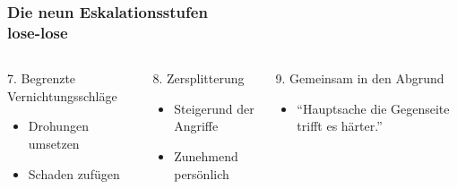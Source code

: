\documentclass[
	ngerman,
	xcolor=dvipsnames,
	11pt
	]{beamer}
\begin{document}
\begin{frame}
	\frametitle{Die neun Eskalationsstufen\\lose-lose}
\begin{columns}[t]
	\begin{column}{0.33\textwidth}
		\begin{block}{7. Begrenzte Vernichtungsschläge}
			\begin{itemize}
				\item Drohungen umsetzen
				\item Schaden zufügen
			\end{itemize}
		\end{block}
	\end{column}
	\pause
	\begin{column}{0.33\textwidth}
		\begin{block}{8. Zersplitterung}
			\begin{itemize}
				\item Steigerund der Angriffe
				\item Zunehmend persönlich
			\end{itemize}
		\end{block}
	\end{column}
	\pause
	\begin{column}{0.33\textwidth}
		\begin{block}{9. Gemeinsam in den Abgrund}
			\begin{itemize}
				\item ``Hauptsache die Gegenseite trifft es härter.''
			\end{itemize}
		\end{block}
	\end{column}
\end{columns}
\end{frame}

%
%
%
%
%
%
%
%
%
%
\end{document}
